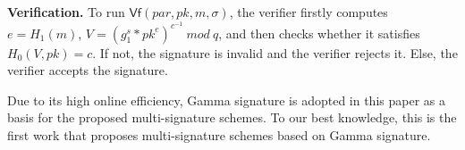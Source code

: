 \documentclass[journal]{IEEEtran}
\begin{document}
\noindent\textbf{Verification.} To run \(\textsf{Vf}(par,pk,m,\sigma)\), the verifier firstly computes \(e=H_1(m)\), \(V=(g_1^s*pk^e)^{c^{-1}}\ mod\ q\), and then checks whether it satisfies \(H_0(V,pk)=c\). If not, the signature is invalid and the verifier rejects it. Else, the verifier accepts the signature.

Due to its high online efficiency, Gamma signature is adopted in this paper as a basis for the proposed multi-signature schemes. To our best knowledge, this is the first work that proposes multi-signature schemes based on Gamma signature.






\end{document}
